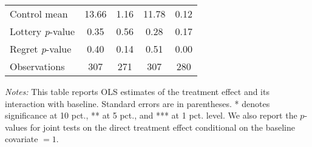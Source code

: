 \begin{table}[htbp]
{\begin{threeparttable}
\begin{tabular}{l*{4}{c}}
Control mean    &    13.66         &     1.16         &    11.78         &     0.12         \\
Lottery \emph{p}-value&     0.35         &     0.56         &     0.28         &     0.17         \\
Regret \emph{p}-value&     0.40         &     0.14         &     0.51         &     0.00         \\
Observations    &      307         &      271         &      307         &      280         \\
\bottomrule \end{tabular} \begin{tablenotes}[flushleft] \footnotesize \item \emph{Notes:} This table reports OLS estimates of the treatment effect and its interaction with baseline. Standard errors are in parentheses. * denotes significance at 10 pct., ** at 5 pct., and *** at 1 pct. level. We also report the \(p\)-values for joint tests on the direct treatment effect conditional on the baseline covariate $= 1$. \end{tablenotes} \end{threeparttable} } \end{table}

